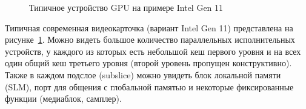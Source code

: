\begin{figure}[ht]
    \caption{Типичное устройство GPU на примере Intel Gen 11}\label{fig:typicalGPU}
\end{figure}

Типичная современная видеокарточка (вариант Intel Gen 11) представлена на рисунке~\cref{fig:typicalGPU}. Можно видеть большое количество параллельных исполнительных устройств, у каждого из которых есть небольшой кеш первого уровня и на всех один общий кеш третьего уровня (второй уровень пропущен конструктивно). Также в каждом подслое (subslice) можно увидеть блок локальной памяти (SLM), порт для общения с глобальной памятью и некоторые фиксированные функции (медиаблок, самплер).


